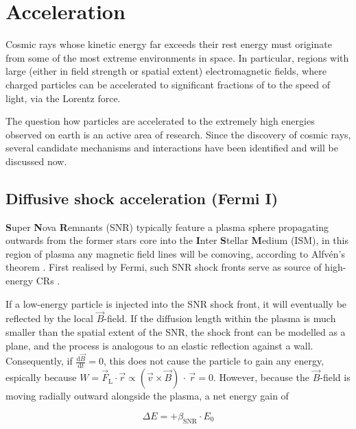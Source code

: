 \section{Acceleration}
\label{sec:cr-acceleration}

Cosmic rays whose kinetic energy far exceeds their rest energy must originate from some of the most extreme environments in space. In particular, regions with 
large (either in field strength or spatial extent) electromagnetic fields, where charged particles can be accelerated to significant fractions of to the speed of 
light, via the Lorentz force. 

The question how particles are accelerated to the extremely high energies observed on earth is an active area of research. Since the discovery of cosmic rays, 
several candidate mechanisms and interactions have been identified and will be discussed now.

\subsection{Diffusive shock acceleration (Fermi I)}
\label{ssec:cr-fermi-i}

\textbf{S}uper \textbf{N}ova \textbf{R}emnants (SNR) typically feature a plasma sphere propagating outwards from the former stars core into the 
\textbf{I}nter \textbf{S}tellar \textbf{M}edium (ISM), in this region of plasma any magnetic field lines will be comoving, according to Alfvén's theorem 
\cite{alfven1942existence}. First realised by Fermi, such SNR shock fronts serve as source of high-energy CRs \cite{fermi1949origin}.

If a low-energy particle is injected into the SNR shock front, it will eventually be reflected by the local $\vec{B}$-field. If the diffusion length within the
plasma is much smaller than the spatial extent of the SNR, the shock front can be modelled as a plane, and the process is analogous to an elastic reflection 
against a wall. Consequently, if $\frac{\text{d}\vec{B}}{\text{d}t} = 0$, this does not cause the particle to gain any energy, espically because 
$W = \vec{F}_\text{L} \cdot \vec{r} \propto (\vec{v}\times\vec{B})\,\cdot\,\vec{r} = 0$. However, because the $\vec{B}$-field is moving radially outward alongside 
the plasma, a net energy gain of 

\begin{equation}
\label{eq:fermi-energy-gain}
\Delta E = +\beta_\text{SNR} \cdot E_0
\end{equation}

